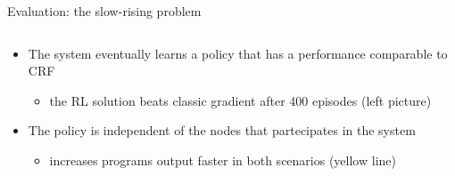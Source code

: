 \documentclass[8pt, aspectratio=169, handout]{beamer}
\begin{document}
\begin{frame}{Evaluation: the slow-rising problem}
\begin{card}
\begin{itemize}
    \end{itemize}
  \end{card}  
  \begin{columns}
    \begin{column}{0.3\textwidth}
    \end{column}
    \begin{column}{0.38\textwidth}
    \end{column}  
  \end{columns}
  \begin{card}[Results]
    \begin{itemize}
      \item The system eventually learns a policy that has a performance comparable to CRF
      \begin{itemize}
        \item the RL solution beats classic gradient after 400 episodes (left picture)
      \end{itemize}
      \item The policy is independent of the nodes that partecipates in the system
      \begin{itemize}
        \item increases programs output faster in both scenarios (yellow line)
      \end{itemize}
    \end{itemize}
  \end{card}
  \begin{multicols}{3}
  \end{multicols}
\end{frame}
\end{document}
